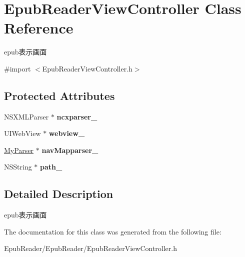 \hypertarget{interface_epub_reader_view_controller}{\section{Epub\-Reader\-View\-Controller Class Reference}
\label{interface_epub_reader_view_controller}
}


epub表示画面  




{\ttfamily \#import $<$Epub\-Reader\-View\-Controller.\-h$>$}

\subsection*{Protected Attributes}
\begin{DoxyCompactItemize}
\item 
\hypertarget{interface_epub_reader_view_controller_a7da486cf3293433b615d89c38b390548}{N\-S\-X\-M\-L\-Parser $\ast$ {\bfseries ncxparser\-\_\-}}\label{interface_epub_reader_view_controller_a7da486cf3293433b615d89c38b390548}

\item 
\hypertarget{interface_epub_reader_view_controller_a6fc2b2f71f16dd50077c7abec6263588}{U\-I\-Web\-View $\ast$ {\bfseries webview\-\_\-}}\label{interface_epub_reader_view_controller_a6fc2b2f71f16dd50077c7abec6263588}

\item 
\hypertarget{interface_epub_reader_view_controller_afe59b4fc415e7a129ee6297b0acb53c8}{\hyperlink{interface_my_parser}{My\-Parser} $\ast$ {\bfseries nav\-Mapparser\-\_\-}}\label{interface_epub_reader_view_controller_afe59b4fc415e7a129ee6297b0acb53c8}

\item 
\hypertarget{interface_epub_reader_view_controller_abab8c8fc8154b84560fd7422d45e1aa7}{N\-S\-String $\ast$ {\bfseries path\-\_\-}}\label{interface_epub_reader_view_controller_abab8c8fc8154b84560fd7422d45e1aa7}

\end{DoxyCompactItemize}


\subsection{Detailed Description}
epub表示画面 

The documentation for this class was generated from the following file\-:\begin{DoxyCompactItemize}
\item 
Epub\-Reader/\-Epub\-Reader/Epub\-Reader\-View\-Controller.\-h\end{DoxyCompactItemize}
